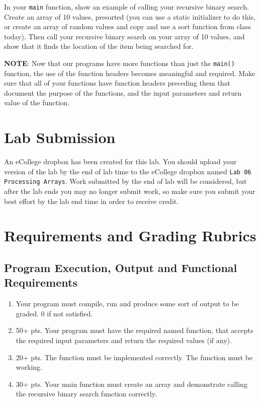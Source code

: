 \documentclass[11pt]{article}
\begin{document}
In your \verb~main~ function, show an example of calling your recursive
binary search.  Create an array of 10 values, presorted (you can use a
static initializer to do this, or create an array of random values and
copy and use a sort function from class today).  Then call your
recursive binary search on your array of 10 values, and show that it
finds the location of the item being searched for.

\textbf{NOTE}: Now that our programs have more functions than just the
\verb~main()~ function, the use of the function headers becomes meaningful
and required.  Make sure that all of your functions have function
headers preceding them that document the purpose of the functions, and
the input parameters and return value of the function.
\section*{Lab Submission}
\label{sec-4}


An eCollege dropbox has been created for this lab.  You should
upload your version of the lab by the end of lab time to the eCollege
dropbox named \verb~Lab 06 Processing Arrays~.  Work submitted by the end
of lab will be considered, but after the lab ends you may no longer
submit work, so make sure you submit your best effort by the lab end
time in order to receive credit.
\section*{Requirements and Grading Rubrics}
\label{sec-5}
\subsection*{Program Execution, Output and Functional Requirements}
\label{sec-5-1}


\begin{enumerate}
\item Your program must compile, run and produce some sort of output to be
  graded. 0 if not satisfied.
\item 50+ pts.  Your program must have the required named function,
   that accepts the required input parameters and return the required
   values (if any).
\item 20+ pts. The function must be implemented correctly.  The function
   must be working.
\item 30+ pts. Your main function must create an array and demonstrate
   calling the recursive binary search function correctly.
\end{enumerate}
\end{document}
